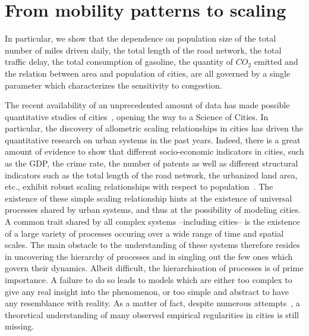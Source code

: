 %
\chapter{From mobility patterns to scaling}
\label{sec:from_mobility_patterns_to_scaling}

\bigskip

In particular, we show that the dependence on population size of the total
number of miles driven daily, the total length of the road network, the total
traffic delay, the total consumption of gasoline, the quantity of $CO_2$ emitted
and the relation between area and population of cities, are all governed by a
single parameter which characterizes the sensitivity to congestion. 


The recent availability of an unprecedented amount of data has made possible
quantitative studies of cities~\cite{Fujita:1999,Batty:2007,Marshall:2004},
opening the way to a Science of Cities. In particular, the discovery of
allometric scaling relationships in cities has driven the quantitative research
on urban systems in the past years. Indeed, there is a great amount of evidence
to show that different socio-economic indicators in cities, such as the GDP, the
crime rate, the number of patents as well as different structural indicators
such as the total length of the road network, the urbanized land area, etc.,
exhibit robust scaling relationships with respect to
population~\cite{Newman:1989,Makse:1995,Pumain:2006,Bettencourt:2007,Samaniego:2008,Rozenfeld:2008,Pan:2013}.
The existence of these simple scaling relationship hints at the existence of
universal processes shared by urban systems, and thus at the possibility of
modeling cities.\\

A common trait shared by all complex systems --including cities-- is the
existence of a large variety of processes occuring over a wide range of time and
spatial scales. The main obstacle to the understanding of these systems
therefore resides in uncovering the hierarchy of processes and in singling out
the few ones which govern their dynamics. Albeit difficult, the hierarchisation
of processes is of prime importance. A failure to do so leads to models which
are  either too complex to give any real insight into the phenomenon, or too
simple and abstract to have any resemblance with reality. As a matter of fact,
despite numerous
attempts~\cite{Fujita:1982,Makse:1995,Batty:2008,Frasco:2013,Bettencourt:2010,Bettencourt:2013},
a theoretical understanding of many observed empirical regularities in cities is
still missing.\\

